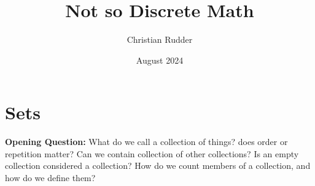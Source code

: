 \documentclass{article}
\title{Not so Discrete Math}
\author{Christian Rudder}
\date{August 2024}
\begin{document}
\maketitle

\section{Sets}
\textbf{Opening Question:} What do we call a collection of things?
does order or repetition matter? Can we contain collection of other collections? Is an empty collection
considered a collection? How do we count members of a collection, and how do we define them?\\


\end{document}
